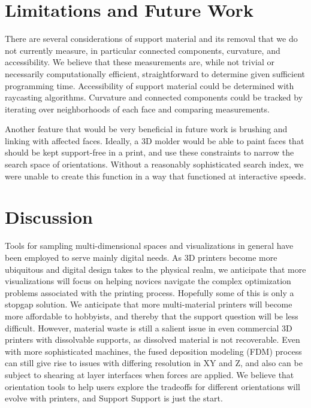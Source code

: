 \documentclass{sigchi}
\begin{document}
\section{Limitations and Future Work}
There are several considerations of support material and its removal that we do not currently measure, in particular connected components, curvature, and accessibility.  We believe that these measurements are, while not trivial or necessarily computationally efficient, straightforward to determine given sufficient programming time.  Accessibility of support material could be determined with raycasting algorithms.  Curvature and connected components could be tracked by iterating over neighborhoods of each face and comparing measurements.

Another feature that would be very beneficial in future work is brushing and linking with affected faces.  Ideally, a 3D molder would be able to paint faces that should be kept support-free in a print, and use these constraints to narrow the search space of orientations.  Without a reasonably sophisticated search index, we were unable to create this function in a way that functioned at interactive speeds.

\section{Discussion}
Tools for sampling multi-dimensional spaces and visualizations in general have been employed to serve mainly digital needs.  As 3D printers become more ubiquitous and digital design takes to the physical realm, we anticipate that more visualizations will focus on helping novices navigate the complex optimization problems associated with the printing process.  Hopefully some of this is only a stopgap solution.  We anticipate that more multi-material printers will become more affordable to hobbyists, and thereby that the support question will be less difficult.  However, material waste is still a salient issue in even commercial 3D printers with dissolvable supports, as dissolved material is not recoverable.  Even with more sophisticated machines, the fused deposition modeling (FDM) process can still give rise to issues with differing resolution in XY and Z, and also can be subject to shearing at layer interfaces when forces are applied.  We believe that orientation tools to help users explore the tradeoffs for different orientations will evolve with printers, and Support Support is just the start.
\end{document}
